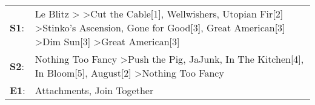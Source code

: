 \begin{supertabular}{p{0.03\textwidth}p{0.92\textwidth}}
 \textbf{S1}:  &  Le Blitz\textsuperscript{} \textgreater {}\textsuperscript{} \textgreater \enspace Cut the Cable[1]\textsuperscript{}, \enspace Wellwishers\textsuperscript{}, \enspace Utopian Fir[2]\textsuperscript{} \textgreater \enspace Stinko's Ascension\textsuperscript{}, \enspace Gone for Good[3]\textsuperscript{}, \enspace Great American[3]\textsuperscript{} \textgreater \enspace Dim Sun[3]\textsuperscript{} \textgreater \enspace Great American[3]\textsuperscript{}  \enspace  \\
 \textbf{S2}:  &                                                                                                                                                                       Nothing Too Fancy\textsuperscript{} \textgreater \enspace Push the Pig\textsuperscript{}, \enspace JaJunk\textsuperscript{}, \enspace In The Kitchen[4]\textsuperscript{}, \enspace In Bloom[5]\textsuperscript{}, \enspace August[2]\textsuperscript{} \textgreater \enspace Nothing Too Fancy\textsuperscript{}  \enspace  \\
 \textbf{E1}:  &                                                                                                                                                                                                                                                                                                                                                                                                                 Attachments\textsuperscript{}, \enspace Join Together\textsuperscript{}  \enspace  \\
\end{supertabular}
